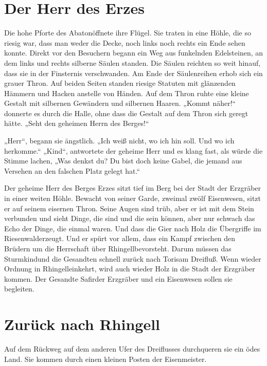 \documentclass[12pt,a4paper,onecolumn,twoside,ngerman]{book}
\newcommand{\Sturmkind}{Sturmkind}
\newcommand{\Rhingell}{Rhingell}
\newcommand{\Dreifluss}{Dreifluß}
\newcommand{\Toris}{Toris}
\newcommand{\Riesenwald}{Riesenwald}
\newcommand{\Eisenmeister}{Eisenmeister}
\newcommand{\Abaton}{Abaton}
\newcommand{\Safir}{Safir}
\begin{document}
\section{Der Herr des Erzes}
Die hohe Pforte des \Abaton öffnete ihre Flügel. Sie traten in eine Höhle, die so riesig war, dass man weder die Decke, noch links noch rechts ein Ende sehen konnte. Direkt vor den Besuchern begann ein Weg aus funkelnden Edelsteinen, an dem links und rechts silberne Säulen standen. Die Säulen reichten so weit hinauf, dass sie in der Finsternis verschwanden.
Am Ende der Säulenreihen erhob sich ein grauer Thron. Auf beiden Seiten standen riesige Statuten mit glänzenden Hämmern und Hacken anstelle von Händen. Auf dem Thron ruhte eine kleine Gestalt mit silbernen Gewändern und silbernen Haaren. „Kommt näher!“ donnerte es durch die Halle, ohne dass die Gestalt auf dem Thron sich geregt hätte. „Seht den geheimen Herrn des Berges!“ 

„Herr“, begann sie ängstlich. „Ich weiß nicht, wo ich hin soll. Und wo ich herkomme.“
„Kind“, antwortete der geheime Herr und es klang fast, als würde die Stimme lachen, „Was denkst du? Du bist doch keine Gabel, die jemand aus Versehen an den falschen Platz gelegt hat.“

Der geheime Herr des Berges Erzes sitzt tief im Berg bei der Stadt der Erzgräber in einer weiten Höhle. Bewacht von seiner Garde, zweimal zwölf Eisenwesen, sitzt er auf seinem eisernen Thron. Seine Augen sind trüb, aber er ist mit dem Stein verbunden und sieht Dinge, die sind und die sein können, aber nur schwach das Echo der Dinge, die einmal waren. Und dass die Gier nach Holz die Übergriffe im \Riesenwald erzeugt. Und er spürt vor allem, dass ein Kampf zwischen den Brüdern um die Herrschaft über \Rhingell bevorsteht. Darum müssen das \Sturmkind und die Gesandten schnell zurück nach \Toris am \Dreifluss. Wenn wieder Ordnung in \Rhingell einkehrt, wird auch wieder Holz in die Stadt der Erzgräber kommen. Der Gesandte \Safir der Erzgräber und ein Eisenwesen sollen sie begleiten.

\section{Zurück nach \Rhingell}
Auf dem Rückweg auf dem anderen Ufer des Dreiflusses durchqueren sie ein ödes Land. Sie kommen durch einen kleinen Posten der \Eisenmeister. 

\end{document}
